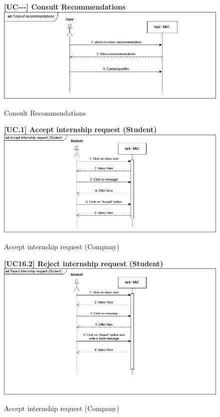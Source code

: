 \begin{figure}[H]
\textbf{[UC\nextUCDiagr-\nextUCDiagr-\nextUCDiagr-\nextUCDiagr] Consult Recommendations}\newline\newline
\includegraphics[width=15cm]{Images/UC_diagram/RASD-UC13.drawio.png}
    \caption{Consult Recommendations}
\end{figure}

\begin{figure}[H]
\textbf{[UC\nextUCDiagr.1] Accept internship request (Student)}\newline\newline
\includegraphics[width=15cm]{Images/UC_diagram/RASD-UC14.drawio.png}
    \caption{Accept internship request (Company)}
\end{figure}

\begin{figure}[H]
\textbf{[UC16.2] Reject internship request (Student)}\newline\newline
\includegraphics[width=15cm]{Images/UC_diagram/RASD-UC16.drawio.png}
    \caption{Accept internship request (Company)}
\end{figure}

